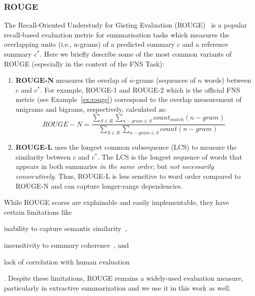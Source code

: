 \subsubsection{ROUGE}\label{subsubsec:rouge}
The Recall-Oriented Understudy for Gisting Evaluation (ROUGE)~\cite{lin2004rouge} is a popular recall-based evaluation metric for
summarisation tasks which measures the overlapping units (i.e., n-grams) of a predicted summary $c$ and a reference summary $c^{*}$.
Here we briefly describe some of the most common variants of ROUGE (especially in the context of the FNS Task):
\begin{enumerate}
    \item \textbf{ROUGE-N} measures the overlap of $n$-grams (sequences of $n$ words) between $c$ and $c^{*}$.
    For example, ROUGE-1 and ROUGE-2 which is the official FNS metric (see Example~\ref{ex:rouge}) correspond to the overlap measurement of unigrams and bigrams, respectively, calculated as:
    \begin{equation}\label{eq:rouge_formula}
        ROUGE-N = \frac{\sum_{S \in R} \sum_{n-gram \in S} count_{match}(n-gram)}{\sum_{S \in R} \sum_{n-gram \in S} count(n-gram)}
    \end{equation}
    \item \textbf{ROUGE-L} uses the longest common subsequence (LCS) to measure the similarity between $c$ and $c^{*}$.
    The LCS is the longest sequence of words that appears in both summaries \emph{in the same order}, but \emph{not necessarily consecutively}.
    Thus, ROUGE-L is less sensitive to word order compared to ROUGE-N and can capture longer-range dependencies.
\end{enumerate}

While ROUGE scores are explainable and easily implementable, they have certain limitations like
\begin{enumerate*}
    \item inability to capture semantic similarity~\cite{akter-etal-2022-revisiting},
    \item insensitivity to summary coherence~\cite{christensen-etal-2013-towards}, and
    \item lack of correlation with human evaluation~\cite{liu2010exploring}
\end{enumerate*}.
Despite these limitations, ROUGE remains a widely-used evaluation measure, particularly in extractive summarization and we use it in this work as well.


